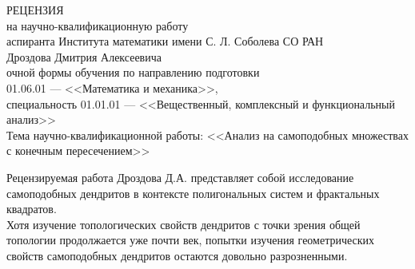 \documentclass[oneside, 14pt, a4paper]{extreport}
\begin{document}
\begin{center}
РЕЦЕНЗИЯ\\
на научно-квалификационную работу\\
аспиранта Института математики имени С. Л. Соболева СО РАН\\
Дроздова Дмитрия Алексеевича\\
очной формы обучения по направлению подготовки\\
01.06.01 --- <<Математика и механика>>,\\
специальность 01.01.01 --- <<Вещественный, комплексный и функциональный анализ>>\\
Тема научно-квалификационной работы: <<Анализ на самоподобных множествах с конечным пересечением>>
\end{center}

%
%
%
%

Рецензируемая работа  Дроздова Д.А. представляет собой исследование самоподобных дендритов в контексте полигональных систем и фрактальных квадратов.
\\

Хотя изучение топологических свойств дендритов с точки зрения общей топологии продолжается уже почти век, попытки изучения геометрических свойств самоподобных дендритов остаются довольно разрозненными.
\\
 
\end{document}
